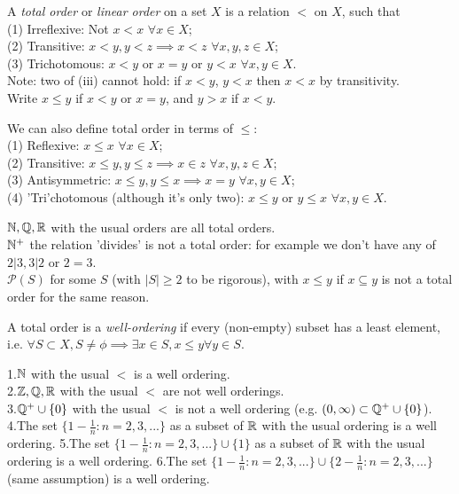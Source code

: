\documentclass[a4paper]{article}
\begin{document}
\begin{defi}
A \emph{total order} or \emph{linear order} on a set $X$ is a relation $<$ on $X$, such that\\
(1) Irreflexive: Not $x<x$ $\forall x \in X$;\\
(2) Transitive: $x<y,y<z\implies x<z$ $\forall x,y,z \in X$;\\
(3) Trichotomous: $x<y$ or $x=y$ or $y<x$ $\forall x,y \in X$.\\
Note: two of (iii) cannot hold: if $x<y$, $y<x$ then $x<x$ by transitivity.\\
Write $x \leq y$ if $x<y$ or $x=y$, and $y>x$ if $x<y$.

We can also define total order in terms of $\leq$:\\
(1) Reflexive: $x \leq x$ $\forall x \in X$;\\
(2) Transitive: $x\leq y, y \leq z \implies x \in z$ $\forall x,y,z \in X$;\\
(3) Antisymmetric: $x \leq y,y \leq x \implies x=y$ $\forall x,y \in X$;\\
(4) 'Tri'chotomous (although it's only two): $x\leq y$ or $y \leq x$ $\forall x,y \in X$.
\end{defi}

\begin{eg}
$\mathbb{N},\mathbb{Q},\mathbb{R}$ with the usual orders are all total orders.\\
$\mathbb{N}^+$ the relation 'divides' is not a total order: for example we don't have any of $2|3,3|2$ or $2=3$.\\
$\mathcal{P}(S)$ for some $S$ (with $|S|\geq 2$ to be rigorous), with $x \leq y$ if $x\subseteq y$ is not a total order for the same reason.
\end{eg}

A total order is a \emph{well-ordering} if every (non-empty) subset has a least element, i.e. $\forall S \subset X, S \neq \phi \implies \exists x \in S, x \leq y \forall y \in S$.

\begin{eg}
1.$\mathbb{N}$ with the usual $<$ is a well ordering.\\
2.$\mathbb{Z},\mathbb{Q},\mathbb{R}$ with the usual $<$ are not well orderings.\\
3.$\mathbb{Q}^+ \cup \{0\}$ with the usual $<$ is not a well ordering (e.g. $(0,\infty) \subset \mathbb{Q}^+\cup \{0\}$).\\
4.The set $\{1-\frac{1}{n} : n=2,3,...\}$ as a subset of $\mathbb{R}$ with the usual ordering is a well ordering.
5.The set $\{1-\frac{1}{n} : n=2,3,...\} \cup \{1\}$ as a subset of $\mathbb{R}$ with the usual ordering is a well ordering.
6.The set $\{1-\frac{1}{n} : n=2,3,...\} \cup \{2-\frac{1}{n} : n=2,3,...\}$ (same assumption) is a well ordering.
\end{eg}
\end{document}
